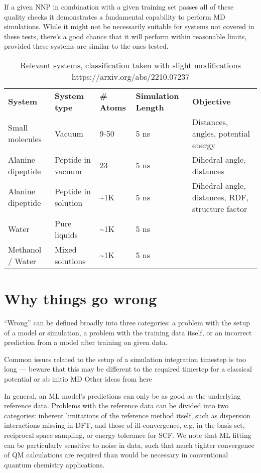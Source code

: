 \documentclass[9pt,bestpractices]{livecoms}
\begin{document}
If a given NNP in combination with a given training set passes all of these quality checks it demonstrates a fundamental capability to perform MD simulations. While it might not be necessarily suitable for systems not covered in these tests, there's a good chance that it will perform within reasonable limits, provided these systems are similar to the ones tested.


\begin{table*}
    \centering
    \begin{tabular}{l|l|l|l|l}
         \textbf{System} & \textbf{System type} & \textbf{\# Atoms} & \textbf{Simulation Length} & \textbf{Objective}\\
Small molecules &    Vacuum &9-50 &5 ns&Distances, angles, potential energy\\      
Alanine dipeptide &Peptide in vacuum&23 &5 ns&Dihedral angle, distances\\
Alanine dipeptide &Peptide in solution& \textasciitilde  1K&5 ns&Dihedral angle, distances, RDF, structure factor\\
Water &Pure liquids& \textasciitilde 1K&5 ns&\\
Methanol / Water &Mixed solutions&\textasciitilde 1K&5 ns&\\         
    \end{tabular}
    \caption{Relevant systems, classification taken with slight modifications https://arxiv.org/abs/2210.07237}
    \label{tab:system_types}
\end{table*}

\section{Why things go wrong}
“Wrong” can be defined broadly into three categories: a problem with the setup of a model or simulation, a problem with the training data itself, or an incorrect prediction from a model after training on given data.

Common issues related to the setup of a simulation
integration timestep is too long — beware that this may be different to the required timestep for a classical potential or ab initio MD
Other ideas from here

In general, an ML model’s predictions can only be as good as the underlying reference data. Problems with the reference data can be divided into two categories: inherent limitations of the reference method itself, such as dispersion interactions missing in DFT, and those of ill-convergence, e.g. in the basis set, reciprocal space sampling, or energy tolerance for SCF. We note that ML fitting can be particularly sensitive to noise in data, such that much tighter convergence of QM calculations are required than would be necessary in conventional quantum chemistry applications.
\end{document}
